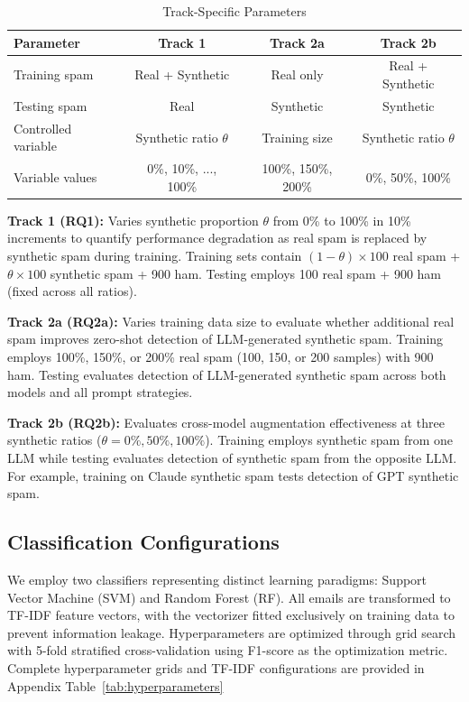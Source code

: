\begin{table}[t]
\centering
\caption{Track-Specific Parameters}
\label{tab:track_params}
\small
\begin{tabular}{lccc}
\toprule
\textbf{Parameter} & \textbf{Track 1} & \textbf{Track 2a} & \textbf{Track 2b} \\
\midrule
Training spam & Real + Synthetic & Real only & Real + Synthetic \\
Testing spam & Real & Synthetic & Synthetic \\
Controlled variable & Synthetic ratio $\theta$ & Training size & Synthetic ratio $\theta$ \\
Variable values & 0\%, 10\%, ..., 100\% & 100\%, 150\%, 200\% & 0\%, 50\%, 100\% \\
\bottomrule
\end{tabular}
\end{table}

\textbf{Track 1 (RQ1):} Varies synthetic proportion $\theta$ from 0\% to 100\% in 10\% increments to quantify performance degradation as real spam is replaced by synthetic spam during training. Training sets contain $(1-\theta) \times 100$ real spam + $\theta \times 100$ synthetic spam + 900 ham. Testing employs 100 real spam + 900 ham (fixed across all ratios).

\textbf{Track 2a (RQ2a):} Varies training data size to evaluate whether additional real spam improves zero-shot detection of LLM-generated synthetic spam. Training employs 100\%, 150\%, or 200\% real spam (100, 150, or 200 samples) with 900 ham. Testing evaluates detection of LLM-generated synthetic spam across both models and all prompt strategies.

\textbf{Track 2b (RQ2b):} Evaluates cross-model augmentation effectiveness at three synthetic ratios ($\theta = 0\%, 50\%, 100\%$). Training employs synthetic spam from one LLM while testing evaluates detection of synthetic spam from the opposite LLM. For example, training on Claude synthetic spam tests detection of GPT synthetic spam.

\subsection{Classification Configurations}

We employ two classifiers representing distinct learning paradigms: Support Vector Machine (SVM) and Random Forest (RF). All emails are transformed to TF-IDF feature vectors, with the vectorizer fitted exclusively on training data to prevent information leakage. Hyperparameters are optimized through grid search with 5-fold stratified cross-validation using F1-score as the optimization metric. Complete hyperparameter grids and TF-IDF configurations are provided in Appendix Table~\ref{tab:hyperparameters}

